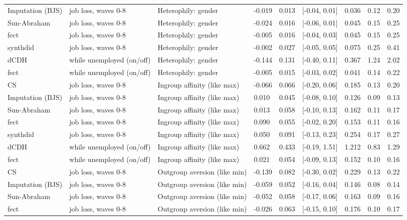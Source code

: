 \begin{tabular}{lllllllll}
Imputation (BJS) & job loss, waves 0-8 & Heterophily: gender & -0.019 & 0.013 & {}[-0.04, 0.01] & 0.036 & 0.12 & 0.20\\
Sun-Abraham & job loss, waves 0-8 & Heterophily: gender & -0.024 & 0.016 & {}[-0.06, 0.01] & 0.045 & 0.15 & 0.25\\
fect & job loss, waves 0-8 & Heterophily: gender & -0.005 & 0.016 & {}[-0.04, 0.03] & 0.045 & 0.15 & 0.25\\
synthdid & job loss, waves 0-8 & Heterophily: gender & -0.002 & 0.027 & {}[-0.05, 0.05] & 0.075 & 0.25 & 0.41\\
dCDH & while unemployed (on/off) & Heterophily: gender & -0.144 & 0.131 & {}[-0.40, 0.11] & 0.367 & 1.24 & 2.02\\
fect & while unemployed (on/off) & Heterophily: gender & -0.005 & 0.015 & {}[-0.03, 0.02] & 0.041 & 0.14 & 0.22\\
CS & job loss, waves 0-8 & Ingroup affinity (like max) & -0.066 & 0.066 & {}[-0.20, 0.06] & 0.185 & 0.13 & 0.20\\
Imputation (BJS) & job loss, waves 0-8 & Ingroup affinity (like max) & 0.010 & 0.045 & {}[-0.08, 0.10] & 0.126 & 0.09 & 0.13\\
Sun-Abraham & job loss, waves 0-8 & Ingroup affinity (like max) & 0.013 & 0.058 & {}[-0.10, 0.13] & 0.162 & 0.11 & 0.17\\
fect & job loss, waves 0-8 & Ingroup affinity (like max) & 0.090 & 0.055 & {}[-0.02, 0.20] & 0.153 & 0.11 & 0.16\\
synthdid & job loss, waves 0-8 & Ingroup affinity (like max) & 0.050 & 0.091 & {}[-0.13, 0.23] & 0.254 & 0.17 & 0.27\\
dCDH & while unemployed (on/off) & Ingroup affinity (like max) & 0.662 & 0.433 & {}[-0.19, 1.51] & 1.212 & 0.83 & 1.29\\
fect & while unemployed (on/off) & Ingroup affinity (like max) & 0.021 & 0.054 & {}[-0.09, 0.13] & 0.152 & 0.10 & 0.16\\
CS & job loss, waves 0-8 & Outgroup aversion (like min) & -0.139 & 0.082 & {}[-0.30, 0.02] & 0.229 & 0.13 & 0.22\\
Imputation (BJS) & job loss, waves 0-8 & Outgroup aversion (like min) & -0.059 & 0.052 & {}[-0.16, 0.04] & 0.146 & 0.08 & 0.14\\
Sun-Abraham & job loss, waves 0-8 & Outgroup aversion (like min) & -0.052 & 0.058 & {}[-0.17, 0.06] & 0.163 & 0.09 & 0.16\\
fect & job loss, waves 0-8 & Outgroup aversion (like min) & -0.026 & 0.063 & {}[-0.15, 0.10] & 0.176 & 0.10 & 0.17\\

\end{tabular}
